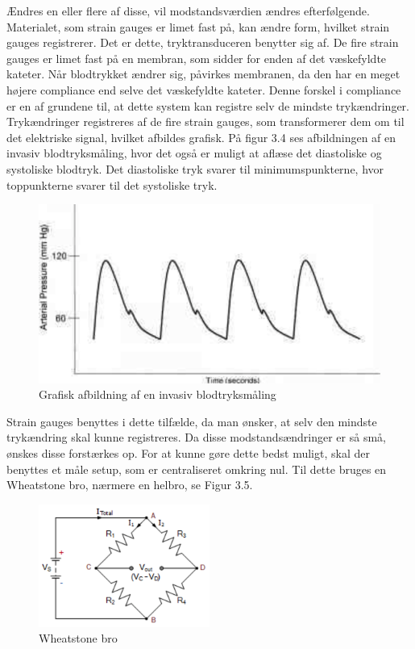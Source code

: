 Ændres en eller flere af disse, vil modstandsværdien ændres efterfølgende. Materialet, som strain gauges er limet fast på, kan ændre form, hvilket strain gauges registrerer. Det er dette, tryktransduceren benytter sig af. De fire strain gauges er limet fast på en membran, som sidder for enden af det væskefyldte kateter. Når blodtrykket ændrer sig, påvirkes membranen, da den har en meget højere compliance end selve det væskefyldte kateter. Denne forskel i compliance er en af grundene til, at dette system kan registre selv de mindste trykændringer. \\ 
Trykændringer registreres af de fire strain gauges, som transformerer dem om til det elektriske signal, hvilket afbildes grafisk. På figur 3.4 ses afbildningen af en invasiv blodtryksmåling, hvor det også er muligt at aflæse det diastoliske og systoliske blodtryk.  Det diastoliske tryk svarer til minimumspunkterne, hvor toppunkterne svarer til det systoliske tryk.


\begin{figure}[H]
	\centering
	\includegraphics[width=1\textwidth]{Figurer/Snip20151207_51}
	\caption{Grafisk afbildning af en invasiv blodtryksmåling}
\end{figure}

Strain gauges benyttes i dette tilfælde, da man ønsker, at selv den mindste trykændring skal kunne registreres. Da disse modstandsændringer er så små, ønskes disse forstærkes op. For at kunne gøre dette bedst muligt, skal der benyttes et måle setup, som er centraliseret omkring nul. Til dette bruges en Wheatstone bro, nærmere en helbro, se Figur 3.5. 

\begin{figure}[H]
	\centering
	\includegraphics[width=0.5\textwidth]{Figurer/Snip20151207_63}
	\caption{Wheatstone bro}
\end{figure}

